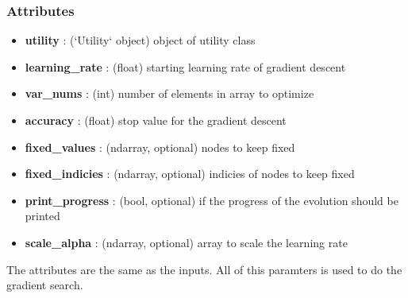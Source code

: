 \documentclass[12pt]{article}
\begin{document}
\subsubsection{Attributes}
\begin{itemize}
  \item 	\textbf{utility} : (`Utility` object)
		object of utility class
  \item 	\textbf{learning\_rate} : (float)
		starting learning rate of gradient descent
  \item 	\textbf{var\_nums} : (int)
		number of elements in array to optimize
  \item 	\textbf{accuracy} : (float)
		stop value for the gradient descent
  \item 	\textbf{fixed\_values} : (ndarray, optional)
		nodes to keep fixed
  \item 	\textbf{fixed\_indicies} : (ndarray, optional)
		indicies of nodes to keep fixed
  \item 	\textbf{print\_progress} : (bool, optional)
		if the progress of the evolution should be printed
  \item 	\textbf{scale\_alpha} : (ndarray, optional)
		array to scale the learning rate
\end{itemize}
The attributes are the same as the inputs. All of this paramters is used to do the gradient search.
\end{document}
